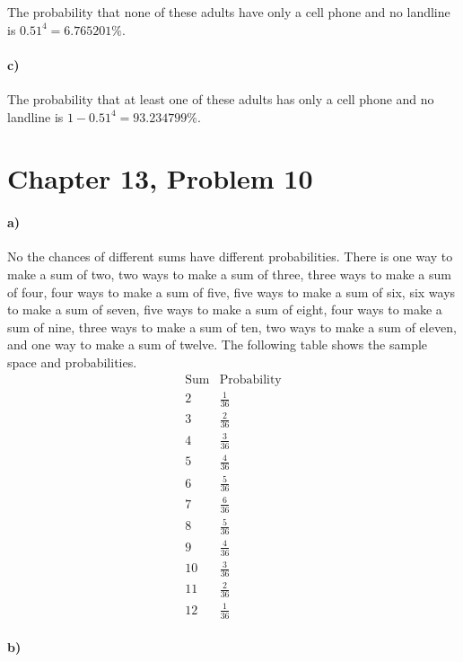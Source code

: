 \documentclass[12pt]{article}
\begin{document}
The probability that none of these adults have only a cell phone
and no landline is \(0.51^4=6.765201\%\).

\paragraph{c)}

The probability that at least one of these adults has only a cell
phone and no landline is \(1-0.51^4=93.234799\%\).

\section*{Chapter 13, Problem 10}

\paragraph{a)}

No the chances of different sums have different probabilities.
There is one way to make a sum of two, two ways to make a sum of three,
three ways to make a sum of four, four ways to make a sum of five, five
ways to make a sum of six, six ways to make a sum of seven, five ways to
make a sum of eight, four ways to make a sum of nine, three ways to make a sum
of ten, two ways to make a sum of eleven, and one way to make a sum of twelve.
The following table shows the sample space and probabilities.
\[
    \begin{array}{c|c}
        \text{Sum} & \text{Probability} \\
        \hline
        2 & \frac{1}{36} \\
        3 & \frac{2}{36} \\
        4 & \frac{3}{36} \\
        5 & \frac{4}{36} \\
        6 & \frac{5}{36} \\
        7 & \frac{6}{36} \\
        8 & \frac{5}{36} \\
        9 & \frac{4}{36} \\
        10 & \frac{3}{36} \\
        11 & \frac{2}{36} \\
        12 & \frac{1}{36}
    \end{array}
\]

\paragraph{b)}
\end{document}
